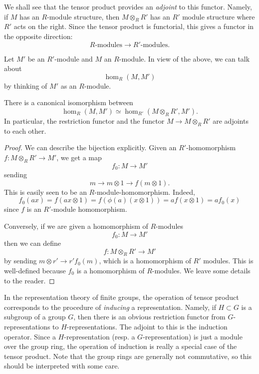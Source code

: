 We shall see that the tensor product provides an \emph{adjoint} to this
functor.
Namely, if $M$ has an $R$-module
structure, then $M \otimes_R R'$ has an $R'$ module structure where $R'$ acts
on the right. Since the tensor product is functorial, this gives a functor
in the opposite direction:
\[ R\mbox{-}\mathrm{modules} \to R'\mbox{-}\mathrm{modules}.  \]


Let $M'$ be an $R'$-module and $M$ an $R$-module. In view of the above,
we can talk about
\[ \hom_R(M, M')  \]
by thinking of $M'$ as an $R$-module.

\begin{proposition}
There is a canonical isomorphism between
\[ \hom_R(M, M') \simeq \hom_{R'}(M \otimes_R R', M').  \]
In particular, the restriction functor and the functor $M \to M \otimes_R R'$
are adjoints to each other.
\end{proposition}


\begin{proof}
We can describe the bijection explicitly. Given an $R'$-homomorphism $f:M
\otimes_R R' \to M'$, we get a map
\[ f_0:M \to M'  \]
sending
\[ m \to m \otimes 1 \to f(m \otimes 1).  \]
This is easily seen to be an $R$-module-homomorphism. Indeed,
\[ f_0(ax) = f(ax \otimes 1) = f(\phi(a)(x \otimes 1)) = a f(x \otimes 1)  =
a f_0(x)  \]
since $f$ is an $R'$-module homomorphism.

Conversely, if we are given a homomorphism of $R$-modules
\[ f_0: M \to M'  \]
then we can define
\[ f: M \otimes_R R' \to M'  \]
by sending $m \otimes r' \to r' f_0(m)$, which is a homomorphism of $R'$
modules.
This is well-defined because $f_0$ is  a homomorphism of $R$-modules. We leave
some details to the reader.
\end{proof}

\begin{example}
In the representation theory of finite groups, the operation of tensor product
corresponds to the procedure of \emph{inducing} a representation. Namely, if
$H \subset G$ is a subgroup of a group $G$, then there is an obvious
restriction functor from $G$-representations to $H$-representations.
The adjoint to this is the induction operator. Since a $H$-representation
(resp. a $G$-representation) is just a module over the group ring, the
operation of induction is really a special case of the tensor product. Note
that the group rings are generally not commutative, so this should be
interpreted with some care.
\end{example}

